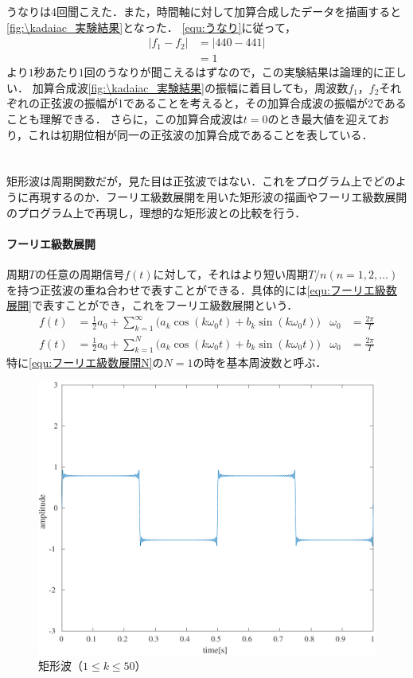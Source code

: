 \result
うなりは4回聞こえた．また，時間軸に対して加算合成したデータを描画すると\ref{fig:\kadaiac_実験結果}となった．
\consideration \eqref{equ:うなり}に従って，
\begin{equation}
    \begin{aligned}
        \big|f_1-f_2\big| & = \big|440-441\big| \\
                          & =1
    \end{aligned}
\end{equation}
より\(1\)秒あたり\(1\)回のうなりが聞こえるはずなので，この実験結果は論理的に正しい．
加算合成波\ref{fig:\kadaiac_実験結果}の振幅に着目しても，周波数\(f_1\)，\(f_2\)それぞれの正弦波の振幅が1であることを考えると，その加算合成波の振幅が2であることも理解できる．
さらに，この加算合成波は\(t=0\)のとき最大値を迎えており，これは初期位相が同一の正弦波の加算合成であることを表している．
\section{\kadaiad}
\purpose
矩形波は周期関数だが，見た目は正弦波ではない．これをプログラム上でどのように再現するのか．フーリエ級数展開を用いた矩形波の描画やフーリエ級数展開のプログラム上で再現し，理想的な矩形波との比較を行う．
\method
\paragraph{フーリエ級数展開}周期\(T\)の任意の周期信号\(f(t)\)に対して，それはより短い周期\(T/n(n=1,2,\dots)\)を持つ正弦波の重ね合わせで表すことができる．具体的には\eqref{equ:フーリエ級数展開}で表すことができ，これをフーリエ級数展開という．\cite[p.18-p.19]{信号処理}
\begin{align}
    f(t) & =\frac{1}{2}a_0 + \sum_{k=1}^{\infty}\big(a_k\cos(k\omega_0t)+b_k\sin(k\omega_0t)\big) & \omega_0 & =\frac{2\pi}{T}\label{equ:フーリエ級数展開}  \\
    f(t) & =\frac{1}{2}a_0 + \sum_{k=1}^{N}\big(a_k\cos(k\omega_0t)+b_k\sin(k\omega_0t)\big)      & \omega_0 & =\frac{2\pi}{T}\label{equ:フーリエ級数展開N}
\end{align}
特に\eqref{equ:フーリエ級数展開N}の\(N=1\)の時を基本周波数と呼ぶ．\\
\begin{figure}
    \caption{矩形波（\(1\leq k\leq 50\)）}
    \label{fig:矩形波}
    \includegraphics[keepaspectratio,width=.3\textwidth]{../../Figures/01_04_1.pdf}
\end{figure}
